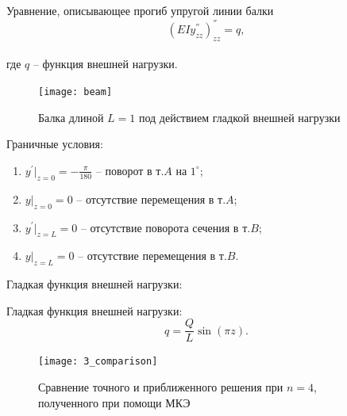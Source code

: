 \documentclass[7pt]{beamer}
\numberwithin{equation}{section}
\begin{document}
\begin{frame}{}
	\begin{block}{Уравнение, описывающее прогиб упругой линии балки}
	$$(EIy^{''}_{zz})^{''}_{zz}=q,$$\\
где  $q$ -- функция внешней нагрузки.
	\end{block}
	\begin{figure}[H]
		\centering
		\texttt{[image: beam]}
		\label{fig:beam}
		\caption{Балка длиной $L=1$ под действием гладкой внешней нагрузки}
	\end{figure}
Граничные условия:
\begin{enumerate} 
	\item $y^{'}|_{z=0}=-\frac{\pi}{180}$ -- поворот в т.$A$ на $1^{\circ};$\\
	\item $y|_{z=0}=0$ -- отсутствие перемещения в т.$A$;\\
	\item $y^{'}|_{z=L}=0$ -- отсутствие поворота сечения в т.$B$;\\
	\item $y|_{z=L}=0$ -- отсутствие перемещения в т.$B$.\\
\end{enumerate}
\end{frame}

\begin{frame}{Гладкая функция внешней нагрузки:}
	\begin{block}{Гладкая функция внешней нагрузки:}
		\[q=\frac{Q}{L} \sin(\pi z).\]
	\end{block}

	\begin{figure}[H]
		\centering
		\texttt{[image: 3\_comparison]}
		\caption{Сравнение точного и приближенного решения при $n=4$, полученного при помощи МКЭ}
		\label{fig:3_comparison}
	\end{figure}
\end{frame}
\end{document}
